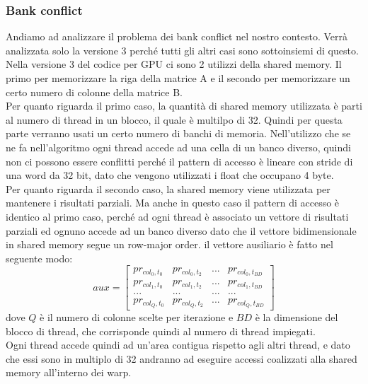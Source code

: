 \documentclass[conference]{IEEEtran}
\begin{document}
\subsubsection{Bank conflict}
Andiamo ad analizzare il problema dei bank conflict nel nostro contesto. Verrà analizzata solo la versione 3 perché tutti gli altri casi sono sottoinsiemi di questo.\\
Nella versione 3 del codice per GPU ci sono 2 utilizzi della shared memory. Il primo per memorizzare la riga della matrice A e il secondo per memorizzare un certo numero di colonne della matrice B.\\
Per quanto riguarda il primo caso, la quantità di shared memory utilizzata è parti al numero di thread in un blocco, il quale è multilpo di 32. Quindi per questa parte verranno usati un certo numero di banchi di memoria. Nell'utilizzo che se ne fa nell'algoritmo ogni thread accede ad una cella di un banco diverso, quindi non ci possono essere conflitti perché il pattern di accesso è lineare con stride di una word da 32 bit, dato che vengono utilizzati i float che occupano 4 byte.\\
Per quanto riguarda il secondo caso, la shared memory viene utilizzata per mantenere i risultati parziali. Ma anche in questo caso il pattern di accesso è identico al primo caso, perché ad ogni thread è associato un vettore di risultati parziali ed ognuno accede ad un banco diverso dato che il vettore bidimensionale in shared memory segue un row-major order. il vettore ausiliario è fatto nel seguente modo:
\[
aux = \left[
\begin{matrix}
pr_{col_0, t_0} & pr_{col_0, t_2} & ... & pr_{col_0, t_{BD}} \\
pr_{col_1, t_0} & pr_{col_1, t_2} & ... & pr_{col_1, t_{BD}} \\
... & ... & ... & ... \\
pr_{col_{Q}, t_0} & pr_{col_{Q}, t_2} & ... & pr_{col_{Q}, t_{BD}}
\end{matrix}\right]
\]
dove $Q$ è il numero di colonne scelte per iterazione e $BD$ è la dimensione del blocco di thread, che corrisponde quindi al numero di thread impiegati.\\
Ogni thread accede quindi ad un'area contigua rispetto agli altri thread, e dato che essi sono in multiplo di 32 andranno ad eseguire accessi coalizzati alla shared memory all'interno dei warp.

\end{document}
